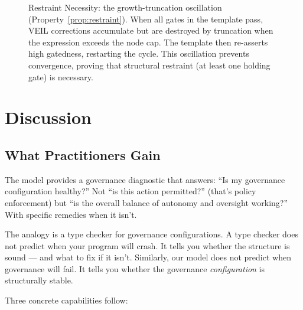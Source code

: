 \documentclass[sigconf,nonacm]{acmart}
\begin{document}
\begin{figure}[t]
  \caption{Restraint Necessity: the growth-truncation oscillation
    (Property~\ref{prop:restraint}). When all gates in the template pass,
    VEIL corrections accumulate but are destroyed by truncation when the
    expression exceeds the node cap. The template then re-asserts high
    gatedness, restarting the cycle. This oscillation prevents convergence,
    proving that structural restraint (at least one holding gate) is
    necessary.}
  \label{fig:restraint}
\end{figure}


\section{Discussion}

\subsection{What Practitioners Gain}

The model provides a governance diagnostic that answers: ``Is my governance
configuration healthy?'' Not ``is this action permitted?'' (that's policy
enforcement) but ``is the overall balance of autonomy and oversight
working?'' With specific remedies when it isn't.

The analogy is a type checker for governance configurations. A type checker
does not predict when your program will crash. It tells you whether the
structure is sound --- and what to fix if it isn't. Similarly, our model
does not predict when governance will fail. It tells you whether the
governance \emph{configuration} is structurally stable.

Three concrete capabilities follow:
\end{document}
